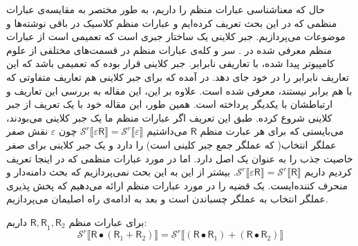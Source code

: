 حال که معناشناسی عبارات منظم را داریم، به طور مختصر به مقایسه‌ی عبارات منظمی که در این بحث تعریف کرده‌ایم و عبارات منظم کلاسیک در باقی نوشته‌ها و موضوعات می‌پردازیم. جبر کلاینی یک ساختار جبری است که تعمیمی است از عبارات منظم معرفی شده در \cite{kleene56}. سر و کله‌ی عبارات منظم در قسمت‌های مختلفی از علوم کامپیوتر پیدا شده‌، با تعاریفی نابرابر. جبر کلاینی قرار بوده که تعمیمی باشد که این تعاریف نابرابر را در خود جای دهد. در \cite{DexterKleene} آمده که برای جبر کلاینی هم تعاریف متفاوتی که با هم برابر نیستند، معرفی شده است. علاوه بر این، این مقاله به بررسی این تعاریف و ارتباطشان با یکدیگر پرداخته است. همین طور، این مقاله خود با یک تعریف از جبر کلاینی شروع کرده. طبق این تعریف اگر عبارات منظم ما یک جبر کلاینی می‌بودند، می‌بایستی که برای هر عبارت منظم $\mathsf{R}$ می‌داشتیم
$\mathcal{S}^r \llbracket \mathsf{\varepsilon R} \rrbracket = \mathcal{S}^r \llbracket \mathsf{\varepsilon} \rrbracket$ 
چون $\varepsilon$ نقش صفر عملگر انتخاب( که عملگر جمع جبر کلینی است) را دارد و یک جبر کلاینی برای صفر خاصیت جذب را به عنوان یک اصل دارد. اما در مورد عبارات منظمی که در اینجا تعریف کردیم داریم 
$\mathcal{S}^r \llbracket \mathsf{\varepsilon R} \rrbracket = \mathcal{S}^r \llbracket \mathsf{R} \rrbracket$.
بیشتر از این به این بحث نمی‌پردازیم که بحث دامنه‌دار و منحرف کننده‌ایست. یک قضیه را در مورد عبارات منظم ارائه می‌دهیم که پخش پذیری عملگر انتخاب به عملگر چسباندن است و بعد به ادامه‌ی راه اصلیمان می‌پردازیم.
\begin{thm}
	برای عبارات منظم
	 $\mathsf{R , R}_1,\mathsf{R}_2$
	 داریم:
	  $$\mathcal{S}^r \llbracket \mathsf{R}\bullet (\mathsf{R}_1 + \mathsf{R}_2) \rrbracket = \mathcal{S}^r \llbracket (\mathsf{R \bullet R}_1) + (\mathsf{R \bullet R}_2) \rrbracket $$
\end{thm}

